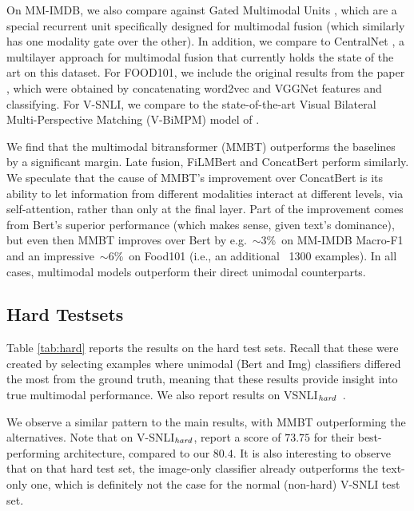 \documentclass[11pt,a4paper]{article}
\begin{document}
On MM-IMDB, we also compare against Gated Multimodal Units \cite{Arevalo:2017mmimdb}, which are a special recurrent unit specifically designed for multimodal fusion (which similarly has one modality gate over the other). In addition, we compare to CentralNet \cite{Vielzeuf:2018eccv}, a multilayer approach for multimodal fusion that currently holds the state of the art on this dataset. For FOOD101, we include the original results from the paper \cite{Wang:2015food101}, which were obtained by concatenating word2vec and VGGNet features and classifying. For V-SNLI, we compare to the state-of-the-art Visual Bilateral Multi-Perspective Matching (V-BiMPM) model of \cite{Vu:2018vsnli}.

We find that the multimodal bitransformer (MMBT) outperforms the baselines by a significant margin. Late fusion, FiLMBert and ConcatBert perform similarly. We speculate that the cause of MMBT's improvement over ConcatBert is its ability to let information from different modalities interact at different levels, via self-attention, rather than only at the final layer. Part of the improvement comes from Bert's superior performance (which makes sense, given text's dominance), but even then MMBT improves over Bert by e.g.~$\sim$3\%~on MM-IMDB Macro-F1 and an impressive~$\sim$6\%~on Food101 (i.e., an additional ~1300 examples).
In all cases, multimodal models outperform their direct unimodal counterparts. 






\subsection{Hard Testsets}

Table \ref{tab:hard} reports the results on the hard test sets. Recall that these were created by selecting examples where unimodal (Bert and Img) classifiers differed the most from the ground truth, meaning that these results provide insight into true multimodal performance. We also report results on VSNLI$_{\emph{hard}}$~\cite{Gururangan:2018arxiv}. 

We observe a similar pattern to the main results, with MMBT outperforming the alternatives. Note that on V-SNLI$_{\emph{hard}}$,  report a score of $73.75$ for their best-performing architecture, compared to our $80.4$. It is also interesting to observe that on that hard test set, the image-only classifier already outperforms the text-only one, which is definitely not the case for the normal (non-hard) V-SNLI test set. 
\end{document}
